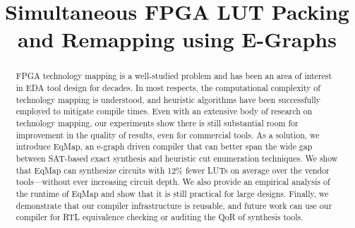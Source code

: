 \documentclass[10pt,conference]{IEEEtran}
\newcommand{\fullname}{Simultaneous FPGA LUT Packing and Remapping using E-Graphs}
\newcommand{\shortname}{EqMap}
\newcommand{\metric}{12\% fewer LUTs}
\begin{document}
\title{\fullname}
\author{}
\maketitle

\begin{abstract}
    FPGA technology mapping is a well-studied problem and has been an area of
    interest in EDA tool design for decades. In most respects, the computational
    complexity of technology mapping is understood, and heuristic algorithms have
    been successfully employed to mitigate compile times. Even with an extensive
    body of research on technology mapping, our experiments show there is still
    substantial room for improvement in the quality of results, even for commercial
    tools. As a solution, we introduce \shortname{}, an e-graph driven compiler
    that can better span the wide gap between SAT-based exact synthesis and
    heuristic cut enumeration techniques. We show that \shortname{} can synthesize
    circuits with \metric{} on average over the vendor tools---without ever
    increasing circuit depth. We also provide an empirical analysis of the runtime
    of \shortname{} and show that it is still practical for large designs. Finally,
    we demonstrate that our compiler infrastructure is reusable, and future work
    can use our compiler for RTL equivalence checking or auditing the QoR of
    synthesis tools.
\end{abstract}












\end{document}
